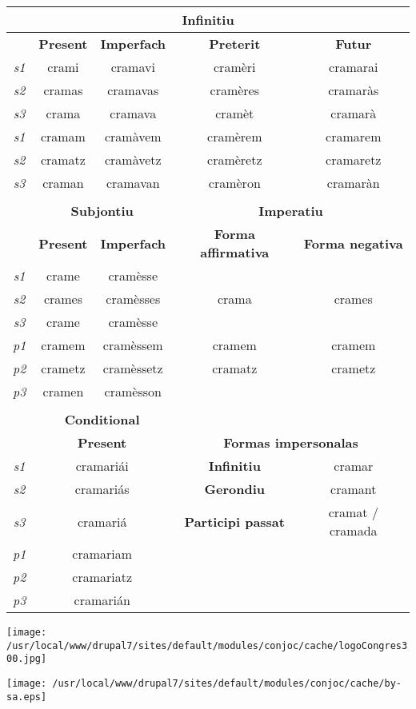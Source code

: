 \documentclass[10pt,a4paper,final]{article}
\begin{document}
\begin{tabular}{|c|c|c|c|c|}
\hline 
\multicolumn{5}{|c|}{\textbf{Infinitiu}} \\ 
\hline 
 & \textbf{Present} & \textbf{Imperfach} & \textbf{Preterit} & \textbf{Futur} \\ 
\hline 
\textit{s1} & crami & cramavi & cramèri & cramarai \\ 
\hline 
\textit{s2} & cramas & cramavas & cramères & cramaràs \\ 
\hline 
\textit{s3} & crama & cramava & cramèt & cramarà \\ 
\hline 
\textit{s1} & cramam & cramàvem & cramèrem & cramarem \\ 
\hline 
\textit{s2} & cramatz & cramàvetz & cramèretz & cramaretz \\ 
\hline 
\textit{s3} & craman & cramavan & cramèron & cramaràn \\ 
\hline 
\multicolumn{5}{|c|}{} \\ 
\hline 
 & \multicolumn{2}{c|}{\textbf{Subjontiu}}  & \multicolumn{2}{c|}{\textbf{Imperatiu}} \\ 
\hline 
 & \textbf{Present} & \textbf{Imperfach} & \textbf{Forma affirmativa} & \textbf{Forma negativa} \\ 
\hline 
\textit{s1} & crame & cramèsse & \multicolumn{2}{c|}{} \\ 
\hline 
\textit{s2} & crames & cramèsses & crama & crames \\ 
\hline 
\textit{s3} & crame & cramèsse & \multicolumn{2}{c|}{} \\ 
\hline 
\textit{p1} & cramem & cramèssem & cramem & cramem \\ 
\hline 
\textit{p2} & crametz & cramèssetz & cramatz & crametz \\ 
\hline 
\textit{p3} & cramen & cramèsson & \multicolumn{2}{c|}{} \\ 
\hline 
\multicolumn{5}{|c|}{} \\ 
\hline 
 & \multicolumn{2}{c|}{\textbf{Conditional}} & \multicolumn{2}{c|}{} \\ 
\hline 
 &  \multicolumn{2}{c|}{\textbf{Present}} & \multicolumn{2}{c|}{\textbf{Formas impersonalas}}  \\ 
\hline 
\textit{s1} & \multicolumn{2}{c|}{cramariái}  & \textbf{Infinitiu} & cramar \\ 
\hline 
\textit{s2} & \multicolumn{2}{c|}{cramariás}  & \textbf{Gerondiu} & cramant \\ 
\hline 
\textit{s3} & \multicolumn{2}{c|}{cramariá}  & \textbf{Participi passat} & cramat / cramada \\ 
\hline 
\textit{p1} & \multicolumn{2}{c|}{cramariam} & \multicolumn{2}{c|}{} \\ 
\hline 
\textit{p2} & \multicolumn{2}{c|}{cramariatz} & \multicolumn{2}{c|}{} \\ 
\hline 
\textit{p3} & \multicolumn{2}{c|}{cramarián} & \multicolumn{2}{c|}{} \\ 
\hline 
\end{tabular}

\begin{center}
\texttt{[image: /usr/local/www/drupal7/sites/default/modules/conjoc/cache/logoCongres300.jpg]}
\end{center}

\hfill\texttt{[image: /usr/local/www/drupal7/sites/default/modules/conjoc/cache/by-sa.eps]}
\end{document}
